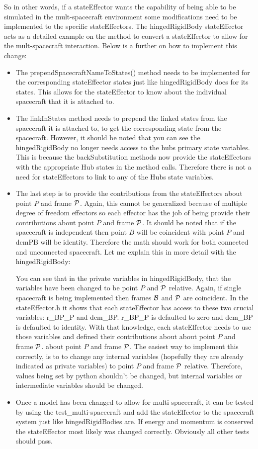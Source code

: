 \begin{itemize}
	So in other words, if a stateEffector wants the capability of being able to be simulated in the mult-spacecraft environment some modifications need to be implemented to the specific stateEffectors. The hingedRigidBody stateEffector acts as a detailed example on the method to convert a stateEffector to allow for the mult-spacecraft interaction. Below is a further on how to implement this change:
	\begin{itemize}
		\item The prependSpacecraftNameToStates() method needs to be implemented for the corresponding stateEffector states just like hingedRigidBody does for its states. This allows for the stateEffector to know about the individual spacecraft that it is attached to.
		\item The linkInStates method needs to prepend the linked states from the spacecraft it is attached to, to get the corresponding state from the spacecraft. However, it should be noted that you can see the hingedRigidBody no longer needs access to the hubs primary state variables. This is because the backSubstitution methods now provide the stateEffectors with the appropriate Hub states in the method calls. Therefore there is not a need for stateEffectors to link to any of the Hubs state variables.
		\item The last step is to provide the contributions from the stateEffectors about point $P$ and frame $\cal P$. Again, this cannot be generalized because of multiple degree of freedom effectors so each effector has the job of being provide their contributions about point $P$ and frame $\cal P$. It should be noted that if the spacecraft is independent then point $B$ will be coincident with point $P$ and dcmPB will be identity. Therefore the math should work for both connected and unconnected spacecraft. Let me explain this in more detail with the hingedRigidBody:
		
		You can see that in the private variables in hingedRigidBody, that the variables have been changed to be point $P$ and $\cal P$ relative. Again, if single spacecraft is being implemented then frames $\cal B$ and $\cal P$ are coincident. In the stateEffector.h it shows that each stateEffector has access to these two crucial variables: r\_BP\_P and dcm\_BP. r\_BP\_P is defaulted to zero and dcm\_BP is defaulted to identity. With that knowledge, each stateEffector needs to use those variables and defined their contributions about about point $P$ and frame $\cal P$. about point $P$ and frame $\cal P$. The easiest way to implement this correctly, is to to change any internal variables (hopefully they are already indicated as private variables) to point $P$ and frame $\cal P$ relative. Therefore, values being set by python shouldn't be changed, but internal variables or intermediate variables should be changed. 
		\item Once a model has been changed to allow for multi spacecraft, it can be tested by using the test\_multi-spacecraft and add the stateEffector to the spacecraft system just like hingedRigidBodies are. If energy and momentum is conserved the stateEffector most likely was changed correctly. Obviously all other tests should pass.
	\end{itemize}


\end{itemize}
